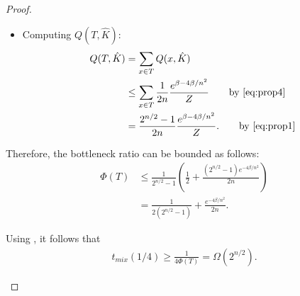 \begin{proof}
\begin{itemize}
  \item Computing $Q(T, \hat{K})$:
    \begin{align*}
      Q(T, \hat{K}) &= \sum_{x \in T} Q(x, \hat{K}) \\
                    &\leq \sum_{x \in T} \frac{1}{2n} \frac{e^{\beta - 4\beta/n^2}}{Z} \tag*{by \eqref{eq:prop4}} \\
                    &= \frac{2^{n/2} - 1}{2n} \frac{e^{\beta - 4\beta/n^2}}{Z}. \tag*{by \eqref{eq:prop1}}
    \end{align*}
\end{itemize}

Therefore, the bottleneck ratio can be bounded as follows:
\begin{align*}
  \Phi(T) &\leq \frac{1}{2^{n/2} - 1}\left(\frac{1}{2} + \frac{(2^{n/2} - 1) e^{-4\beta/n^2}}{2n}\right)\\
          &= \frac{1}{2(2^{n/2} - 1)} + \frac{e^{-4\beta/n^2}}{2n}.
\end{align*}

Using \citep[Theorem 7.3]{levin08book}, it follows that
\begin{align*}
  t_{mix}(1/4) \geq \frac{1}{4\Phi(T)} = \Omega(2^{n/2}).
\end{align*}

\newcommand{\subflen}{0.49\textwidth}
\newcommand{\scspacey}{0em}
\newcommand{\scspacex}{0em}
\begin{figure}[tb]
  \begin{subfigure}[b]{\subflen}
	\centering
\end{subfigure}
\end{figure}
\end{proof}
